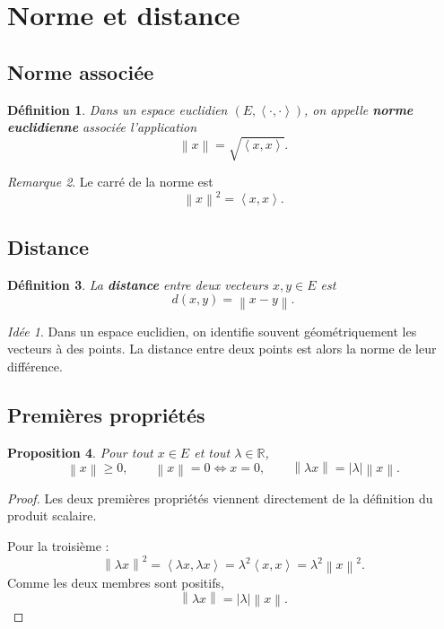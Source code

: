 \documentclass[11pt,a4paper]{article}
\newtheorem{definition}{Définition}[section]
\newtheorem{proposition}[definition]{Proposition}
\theoremstyle{remark}
\newtheorem{remarque}[definition]{Remarque}
\newtheorem*{idee}{Idée}
\newcommand{\R}{\mathbb{R}}
\newcommand{\Norm}[1]{\left\|#1\right\|}
\newcommand{\abs}[1]{\left|#1\right|}
\newcommand{\scal}[2]{\left\langle #1,#2\right\rangle}
\begin{document}
\section{Norme et distance}

\subsection{Norme associée}

\begin{definition}
Dans un espace euclidien \((E,\scal{\cdot}{\cdot})\), on appelle \textbf{norme euclidienne} associée l’application
\[
\Norm{x}=\sqrt{\scal{x}{x}}.
\]
\end{definition}

\begin{remarque}
Le carré de la norme est
\[
\Norm{x}^2=\scal{x}{x}.
\]
\end{remarque}

\subsection{Distance}

\begin{definition}
La \textbf{distance} entre deux vecteurs \(x,y\in E\) est
\[
d(x,y)=\Norm{x-y}.
\]
\end{definition}

\begin{idee}
Dans un espace euclidien, on identifie souvent géométriquement les vecteurs à des points. La distance entre deux points est alors la norme de leur différence.
\end{idee}

\subsection{Premières propriétés}

\begin{proposition}
Pour tout \(x\in E\) et tout \(\lambda\in\R\),
\[
\Norm{x}\ge 0,
\qquad
\Norm{x}=0 \Longleftrightarrow x=0,
\qquad
\Norm{\lambda x}=\abs{\lambda}\Norm{x}.
\]
\end{proposition}

\begin{proof}
Les deux premières propriétés viennent directement de la définition du produit scalaire.

Pour la troisième :
\[
\Norm{\lambda x}^2=\scal{\lambda x}{\lambda x}=\lambda^2\scal{x}{x}=\lambda^2\Norm{x}^2.
\]
Comme les deux membres sont positifs,
\[
\Norm{\lambda x}=\abs{\lambda}\Norm{x}.
\]
\end{proof}
\end{document}
